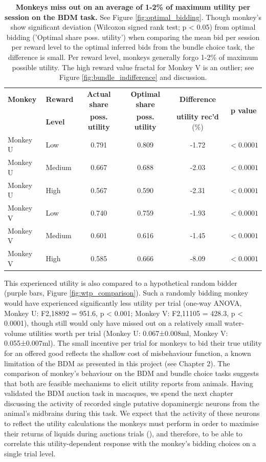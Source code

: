 \begin{table}[htbp]
\centering
\small
\begin{tabular}{llcccc}
\hline
\textbf{Monkey} & \textbf{Reward} & \textbf{Actual share} & \textbf{Optimal share} & \textbf{Difference} & \multirow{2}{*}{\textbf{p value}} \\
 & \textbf{Level} & \textbf{poss. utility} & \textbf{poss. utility} & \textbf{utility rec'd} (\%) & \\
\hline
Monkey U & Low & 0.791 & 0.809 & -1.72 & $< 0.0001$ \\
Monkey U & Medium & 0.667 & 0.688 & -2.03 & $< 0.0001$ \\
Monkey U & High & 0.567 & 0.590 & -2.31 & $< 0.0001$ \\
\hline
Monkey V & Low & 0.740 & 0.759 & -1.93 & $< 0.0001$ \\
Monkey V & Medium & 0.601 & 0.616 & -1.45 & $< 0.0001$ \\
Monkey V & High & 0.585 & 0.666 & -8.09 & $< 0.0001$ \\
\hline
\end{tabular}
\caption[Monkeys miss out on an average of 1-2\% of maximum utility per session on the BDM task.]{\textbf{Monkeys miss out on an average of 1-2\% of maximum utility per session on the BDM task.} See Figure \ref{fig:optimal_bidding}. Though monkey's show significant deviation (Wilcoxon signed rank test; p < 0.05) from optimal bidding ('Optimal share poss. utility') when comparing the mean bid per session per reward level to the optimal inferred bids from the bundle choice task, the difference is small. Per reward level, monkeys generally forgo 1-2\% of maximum possible utility. The high reward value fractal for Monkey V is an outlier; see Figure \ref{fig:bundle_indifference} and discussion.}
\label{tab:utility_comparison}
\end{table}

This experienced utility is also compared to a hypothetical random bidder (purple bars, Figure \ref{fig:wtp_comparison}). Such a randomly bidding monkey would have experienced significantly less utility per trial (one-way ANOVA, Monkey U: F2,18892 = 951.6, p < 0.001; Monkey V: F2,11105 = 428.3, p < 0.0001), though still would only have missed out on a relatively small water-volume utilities worth per trial (Monkey U: 0.067±0.008ml, Monkey V: 0.055±0.007ml). The small incentive per trial for monkeys to bid their true utility for an offered good reflects the shallow cost of misbehaviour function, a known limitation of the BDM as presented in this project (see Chapter 2).
The comparison of monkey’s behaviour on the BDM and bundle choice tasks suggests that both are feasible mechanisms to elicit utility reports from animals. Having validated the BDM auction task in macaques, we spend the next chapter discussing the activity of recorded single putative dopaminergic neurons from the animal’s midbrains during this task. We expect that the activity of these neurons to reflect the utility calculations the monkeys must perform in order to maximise their returns of liquids during auctions trials (\cite{staufferDopamineRewardPrediction2014}), and therefore, to be able to correlate this utility-dependent response with the monkey’s bidding choices on a single trial level.
